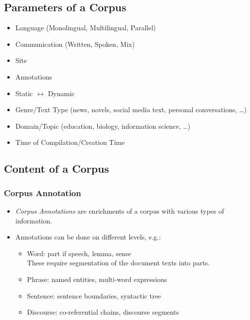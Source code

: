 \documentclass[a4paper, 11pt, accentcolor = tud3b]{tudreport}
\begin{document}
            \subsection{Parameters of a Corpus} %
	            \begin{itemize}
	            	\item Language (Monolingual, Multilingual, Parallel)
	            	\item Communication (Written, Spoken, Mix)
	            	\item Site
	            	\item Annotations
	            	\item Static \(\leftrightarrow\) Dynamic
	            	\item Genre/Text Type (news, novels, social media text, personal conversations, \dots)
	            	\item Domain/Topic (education, biology, information science, \dots)
	            	\item Time of Compilation/Creation Time
	            \end{itemize}

            \subsection{Content of a Corpus} %
                \subsubsection{Corpus Annotation} %
                    \begin{itemize}
                    	\item \textit{Corpus Annotations} are enrichments of a corpus with various types of information.
                    	\item Annotations can be done on different levels, e.g.:
                    		\begin{itemize}
                    			\item Word: part if speech, lemma, sense \\ These require segmentation of the document texts into parts.
                    			\item Phrase: named entities, multi-word expressions
                    			\item Sentence: sentence boundaries, syntactic tree
                    			\item Discourse: co-referential chains, discourse segments
                    		\end{itemize}
                    \end{itemize}
\end{document}

